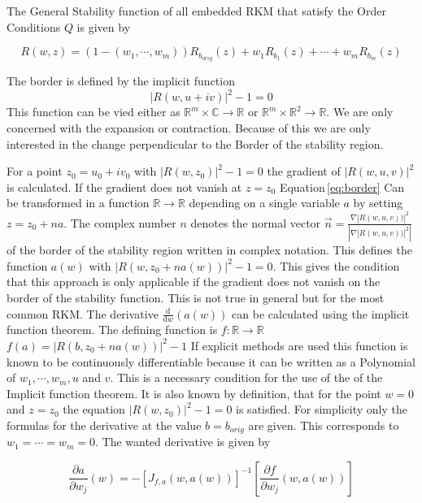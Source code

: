 \documentclass{article}
\begin{document}
The General Stability function of all embedded RKM that satisfy the Order Conditions $Q$ is given by 

\begin{equation}\label{eq:gen_stabilityf}
R(w,z) = (1-(w_1,\cdots,w_m))R_{b_{orig}}(z) + w_1 R_{b_1}(z) + \cdots + w_m R_{b_m}(z)
\end{equation}

The border is defined by the implicit function 
\begin{equation}\label{eq:border}
|R(w,u+iv)|^2 -1 = 0
\end{equation}
This function can be vied either as $\mathbb{R}^m \times  \mathbb{C} \rightarrow \mathbb{R}$ or $\mathbb{R}^m \times  \mathbb{R}^2 \rightarrow \mathbb{R}$.
We are only concerned with the expansion or contraction. Because of this we are only interested in the change perpendicular to the Border of the stability region. 

For a point $z_0= u_0 +i v_0 $ 
with $ |R(w,z_0)|^2 -1 = 0 $ the gradient of
 $|R(w,u,v)|^2$ is calculated. 
If the gradient does not vanish at $z = z_0$ Equation\,\ref{eq:border} Can be transformed in a function $\mathbb{R} \rightarrow \mathbb{R}$ depending on a single variable $a$ by setting $z = z_0 + n a$. The complex number $n$ denotes the normal vector $\vec{n} = \frac{\nabla |R(w,u,v))|^2}{\left| \nabla |R(w,u,v))|^2 \right|}$ of the border of the stability region written in complex notation. This defines the function $a(w)$ with $|R(w,z_0 + n a(w))|^2 -1 = 0$. 
This gives the condition that this approach is only applicable if the gradient does not vanish on the border of the stability function. This is not true in general but for the most common RKM.
The derivative $\frac{\mathrm d}{\mathrm d w} (a(w))$ can be calculated using the implicit function theorem. The defining function is $f: \mathbb{R} \rightarrow \mathbb{R}$ $f(a) = |R(b,z_0 + n a(w))|^2 -1 $ 
If explicit methods are used this function is known to be continuously differentiable because it can be written as a Polynomial of $w_1,\cdots,w_m,u$ and $v$. This is a necessary condition for the use of the of the Implicit function theorem. 
It is also known by definition, that for the point $w=0$ and $z = z_0$ the equation $ |R(w,z_0)|^2 -1 = 0 $ is satisfied.
For simplicity only the formulas for the derivative at the value $b = b_{orig}$ are given. This corresponds to $w_1 = \cdots = w_m = 0$.
The wanted derivative  is given by 

\begin{equation}
 \frac{\partial a}{\partial w_j} (w) =
 - \left[ J_{f,a}(w,a(w))  \right] ^{-1} 
   \left[ \frac{\partial f}{\partial w_j}(w,a(w)) \right]
\end{equation}
\end{document}
